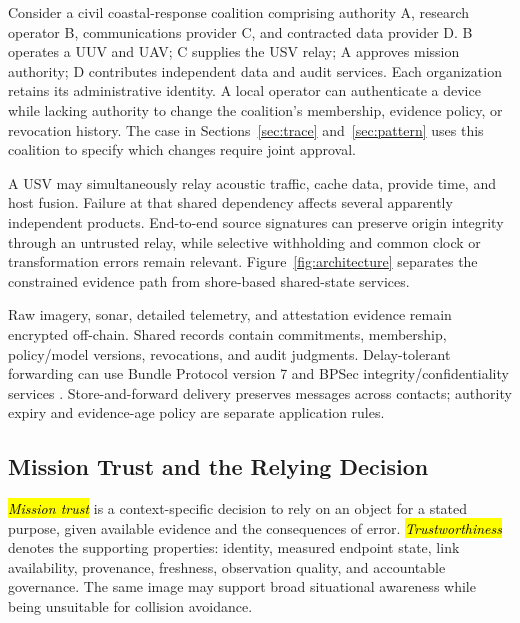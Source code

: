 \documentclass[blockchains,review,accept,moreauthors]{Definitions/mdpi}
\begin{document}
Consider a civil coastal-response coalition comprising authority A, research operator B, communications provider C, and contracted data provider D. B operates a UUV and UAV; C supplies the USV relay; A approves mission authority; D contributes independent data and audit services. Each organization retains its administrative identity. A local operator can authenticate a device while lacking authority to change the coalition's membership, evidence policy, or revocation history. The case in Sections~\ref{sec:trace} and~\ref{sec:pattern} uses this coalition to specify which changes require joint approval.

A USV may simultaneously relay acoustic traffic, cache data, provide time, and host fusion. Failure at that shared dependency affects several apparently independent products. End-to-end source signatures can preserve origin integrity through an untrusted relay, while selective withholding and common clock or transformation errors remain relevant. Figure~\ref{fig:architecture} separates the constrained evidence path from shore-based shared-state services.


Raw imagery, sonar, detailed telemetry, and attestation evidence remain encrypted off-chain. Shared records contain commitments, membership, policy/model versions, revocations, and audit judgments. Delay-tolerant forwarding can use Bundle Protocol version 7 and BPSec integrity/confidentiality services \citep{rfc9171,rfc9172}. Store-and-forward delivery preserves messages across contacts; authority expiry and evidence-age policy are separate application rules.



\subsection{Mission Trust and the Relying Decision}

\emph{\hl{Mission trust}} is a context-specific decision to rely on an object for a stated purpose, given available evidence and the consequences of error. \emph{\hl{Trustworthiness}} denotes the supporting properties: identity, measured endpoint state, link availability, provenance, freshness, observation quality, and accountable governance. The same image may support broad situational awareness while being unsuitable for collision avoidance.
\end{document}
